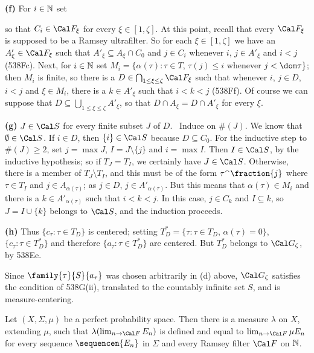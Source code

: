 {\medskip

{\bf (f)} For $i\in\Bbb N$ set


\noindent so that $C_i\in\Cal F_{\xi}$ for every $\xi\in[1,\zeta]$.
At this point, recall that every $\Cal F_{\xi}$ is supposed to be a Ramsey
ultrafilter.   So for each $\xi\in[1,\zeta]$ we have an
$A'_{\xi}\in\Cal F_{\xi}$ such that $A'_{\xi}\subseteq A_{\xi}\cap C_0$ and
$j\in C_i$ whenever $i$, $j\in A'_{\xi}$ and $i<j$ (538Fc).
Next, for $i\in\Bbb N$ set
$M_i=\{\alpha(\tau):\tau\in T$, $\tau(j)\le i$ whenever $j<\dom\tau\}$;
then $M_i$ is finite, so there is a
$D\in\bigcap_{1\le\xi\le\zeta}\Cal F_{\xi}$ such that whenever
$i$, $j\in D$, $i<j$ and $\xi\in M_i$, there is a $k\in A'_{\xi}$ such that
$i<k<j$ (538Ff).   Of course we can suppose that
$D\subseteq\bigcup_{1\le\xi\le\zeta}A'_{\xi}$, so that
$D\cap A_{\xi}=D\cap A'_{\xi}$ for every $\xi$.

\medskip

{\bf (g)} $J\in\Cal S$ for every finite subset $J$ of $D$.   \Prf\ Induce
on $\#(J)$.   We know that $\emptyset\in\Cal S$.   If
$i\in D$, then $\{i\}\in\Cal S$ because $D\subseteq C_0$.   For the
inductive step to $\#(J)\ge 2$, set $j=\max J$, $I=J\setminus\{j\}$ and
$i=\max I$.   Then $I\in\Cal S$, by the inductive hypothesis;  so if
$T_J=T_I$, we certainly have $J\in\Cal S$.   Otherwise, there is a
member of $T_J\setminus T_I$, and this must be of the form
$\tau^{\smallfrown}\fraction{j}$ where $\tau\in T_I$ and
$j\in A_{\alpha(\tau)}$;  as $j\in D$, $j\in A'_{\alpha(\tau)}$.
But this means that $\alpha(\tau)\in M_i$ and
there is a $k\in A'_{\alpha(\tau)}$ such that $i<k<j$.   In this case,
$j\in C_k$ and $I\subseteq k$, so $J=I\cup\{k\}$ belongs to $\Cal S$, and
the induction proceeds.\ \Qed

\medskip

{\bf (h)} Thus $\{c_{\tau}:\tau\in T_D\}$ is centered;  setting
$T^*_D=\{\tau:\tau\in T_D$, $\alpha(\tau)=0\}$,
$\{c_{\tau}:\tau\in T^*_D\}$ and therefore
$\{a_{\tau}:\tau\in T^*_D\}$ are centered.   But $T^*_D$ belongs to
$\Cal G_{\zeta}$, by 538Ee.

Since $\family{\tau}{S}{a_{\tau}}$ was chosen arbitrarily in (d) above,
$\Cal G_{\zeta}$ satisfies the condition of 538G(ii), translated to the
countably infinite set $S$, and is measure-centering.
}%

Let $(X,\Sigma,\mu)$
be a perfect probability space.   Then there is a measure
$\lambda$ on $X$, extending $\mu$, such that
$\lambda(\lim_{n\to\Cal F}E_n)$ is defined and equal to
$\lim_{n\to\Cal F}\mu E_n$ for every sequence $\sequencen{E_n}$ in
$\Sigma$ and every Ramsey filter $\Cal F$ on $\Bbb N$.

